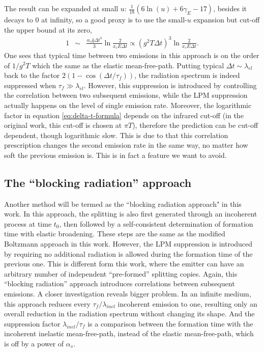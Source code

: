 \documentclass[aps, prc, reprint, amsmath, groupedaddress, nofootinbib]{revtex4-1}
\begin{document}
The result can be expanded at small $u$: $\frac{1}{18}(6\ln(u)+6\gamma_E - 17)$, besides it decays to $0$ at infinity, so a good proxy is to use the small-$u$ expansion but cut-off the upper bound at its zero,
\begin{eqnarray}
1 &\sim&  \frac{\alpha_s\hat{q}\Delta t^3}{3}\ln\frac{2}{ x_c E \Delta t } \propto (g^2 T \Delta t)^3 \ln\frac{2}{ x_c E \Delta t }.
\label{eq:delta-t-formula}
\end{eqnarray}
One sees that typical time between two emissions in this approach is on the order of $1/g^2T$ which the same as the elastic mean-free-path.
Putting typical $\Delta t \sim \lambda_{el}$ back to the factor $2(1-\cos(\Delta t/\tau_f))$, the radiation spectrum is indeed suppressed when $\tau_f \gg \lambda_{el}$.
However, this suppression is introduced by controlling the correlation between two subsequent emissions, while the LPM suppression actually happens on the level of single emission rate.
Moreover, the logarithmic factor in equation \ref{eq:delta-t-formula} depends on the infrared cut-off (in the original work, this cut-off is chosen at $\pi T$), therefore the prediction can be cut-off dependent, though logarithmic slow.
This is due to that this correlation prescription changes the second emission rate in the same way, no matter how soft the previous emission is.
This is in fact a feature we want to avoid.

\subsection{The ``blocking radiation'' approach}
Another method \cite{ColemanSmith:2012vr} will be termed as the ``blocking radiation approach" in this work.
In this approach, the splitting is also first generated through an incoherent process at time $t_0$, then followed by a self-consistent determination of formation time with elastic broadening.
These steps are the same as the modified Boltzmann approach in this work.
However, the LPM suppression is introduced by requiring no additional radiation is allowed during the formation time of the previous one. 
This is different form this work, where the emitter can have an arbitrary number of independent ``pre-formed'' splitting copies.
Again, this ``blocking radiation'' approach introduces correlations between subsequent emissions.
A closer investigation reveals bigger problem.
In an infinite medium, this approach reduces every $\tau_f/\lambda_{inel}$ incoherent emission to one, resulting only an overall reduction in the radiation spectrum without changing its shape.
And the suppression factor $\lambda_{inel}/\tau_f$ is a comparison between  the formation time with the incoherent inelastic mean-free-path, instead of the elastic mean-free-path, which is off by a power of $\alpha_s$.
\end{document}
